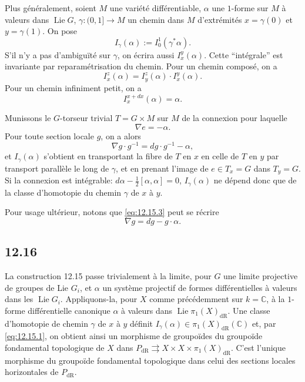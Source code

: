 \documentclass[12pt,a4paper]{article}
\theoremstyle{plain}
\theoremstyle{definition}
\theoremstyle{remark}
\DeclareMathOperator{\Lie}{Lie}
\newcommand{\bC}{\mathbb{C}}
\newcommand{\dr}{\mathrm{dR}}
\begin{document}
Plus généralement, soient $M$ une variété différentiable, $\alpha$ une $1$-forme sur $M$ à valeurs dans $\Lie G$, $\gamma : (0,1] \to M$ un chemin dans $M$ d'extrémités $x = \gamma(0)$ et $y = \gamma(1)$. On pose
\[
I_\gamma(\alpha) := I_0^1(\gamma^* \alpha).
\]
S'il n'y a pas d'ambiguïté sur $\gamma$, on écrira aussi $I_x^y(\alpha)$. Cette ``intégrale'' est invariante par reparamétrisation du chemin. Pour un chemin composé, on a
\begin{equation}\label{eq:12.15.1}
I_x^z(\alpha) = I_y^z(\alpha) \cdot I_x^y(\alpha).
\end{equation}
Pour un chemin infiniment petit, on a
\begin{equation}\label{eq:12.15.2}
I_x^{x+dx}(\alpha) = \alpha.
\end{equation}

Munissons le $G$-torseur trivial $T = G \times M$ sur $M$ de la connexion pour laquelle
\[
\nabla e = -\alpha.
\]
Pour toute section locale $g$, on a alors
\begin{equation}\label{eq:12.15.3}
\nabla g \cdot g^{-1} = dg \cdot g^{-1} - \alpha,
\end{equation}
et $I_\gamma(\alpha)$ s'obtient en transportant la fibre de $T$ en $x$ en celle de $T$ en $y$ par transport parallèle le long de $\gamma$, et en prenant l'image de $e \in T_x = G$ dans $T_y = G$. Si la connexion est intégrable: $d\alpha - \frac{1}{2}[\alpha,\alpha] = 0$, $I_\gamma(\alpha)$ ne dépend donc que de la classe d'homotopie du chemin $\gamma$ de $x$ à $y$.

Pour usage ultérieur, notons que \eqref{eq:12.15.3} peut se récrire
\begin{equation}\label{eq:12.15.4}
\nabla g = dg - g \cdot \alpha.
\end{equation}

\subsection*{12.16}

La construction 12.15 passe trivialement à la limite, pour $G$ une limite projective de groupes de Lie $G_i$, et $\alpha$ un système projectif de formes différentielles à valeurs dans les $\Lie G_i$. Appliquons-la, pour $X$ comme précédemment sur $k = \bC$, à la $1$-forme différentielle canonique $\alpha$ à valeurs dans $\Lie \pi_1(X)_{\dr}$. Une classe d'homotopie de chemin $\gamma$ de $x$ à $y$ définit $I_\gamma(\alpha) \in \pi_1(X)_{\dr}(\bC)$ et, par \eqref{eq:12.15.1}, on obtient ainsi un morphisme de groupoïdes du groupoïde fondamental topologique de $X$ dans $P_{\dr} \rightrightarrows X \times X \times \pi_1(X)_{\dr}$. C'est l'unique morphisme du groupoïde fondamental topologique dans celui des sections locales horizontales de $P_{\dr}$.
\end{document}
